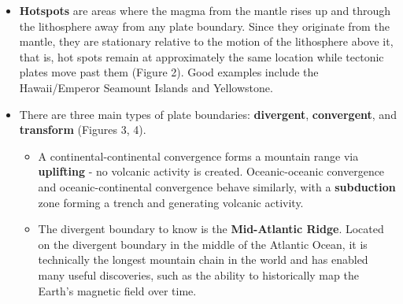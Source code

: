 \documentclass{article}
\begin{document}
\begin{itemize}
	\item \textbf{Hotspots} are areas where the magma from the mantle rises up and through the lithosphere away from any plate boundary. Since they originate from the mantle, they are stationary relative to the motion of the lithosphere above it, that is, hot spots remain at approximately the same location while tectonic plates move past them (Figure 2). Good examples include the Hawaii/Emperor Seamount Islands and Yellowstone.

	\item There are three main types of plate boundaries: \textbf{divergent}, \textbf{convergent}, and \textbf{transform} (Figures 3, 4).
	
	
	\begin{itemize}
		\item A continental-continental convergence forms a mountain range via \textbf{uplifting} - no volcanic activity is created. Oceanic-oceanic convergence and oceanic-continental convergence behave similarly, with a \textbf{subduction} zone forming a trench and generating volcanic activity.
		\item The divergent boundary to know is the \textbf{Mid-Atlantic Ridge}. Located on the divergent boundary in the middle of the Atlantic Ocean, it is technically the longest mountain chain in the world and has enabled many useful discoveries, such as the ability to historically map the Earth's magnetic field over time.
	\end{itemize}
	

\end{itemize}
\end{document}
